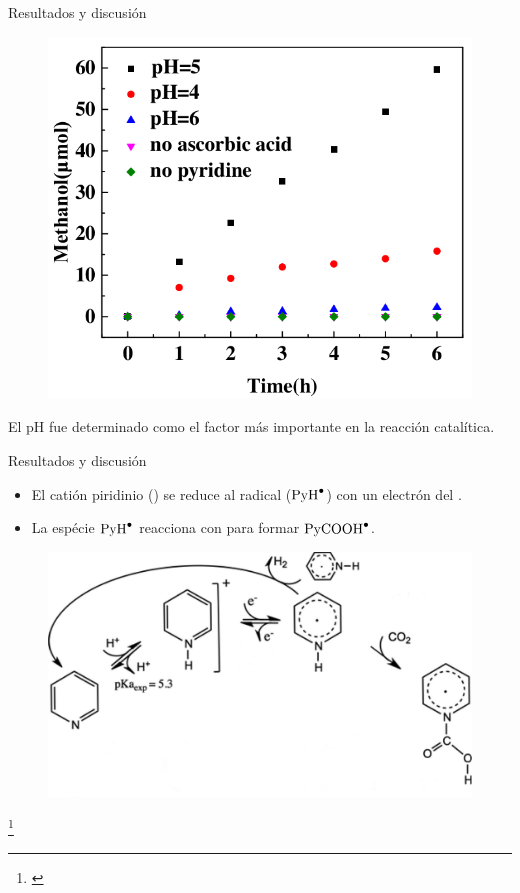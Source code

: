 \documentclass[handout]{beamer}
\newcommand\blfootnote[1]
{%
	\begingroup
	\renewcommand\thefootnote{}\footnote{#1}%
	\addtocounter{footnote}{-1}%
	\endgroup
}
\newcommand{\fcite}[1]{\blfootnote{\cite{#1}}}
\begin{document}
\begin{frame}{Resultados y discusi\'on}
	\begin{figure}[h]
		\centering
		\includegraphics[width=0.5\linewidth]{sources/pHt}
	\end{figure}
	El pH fue determinado como el factor m\'as importante en la reacci\'on catal\'itica.
\end{frame}

\begin{frame}{Resultados y discusi\'on}
	\begin{itemize}
		\item El cati\'on piridinio () se reduce al radical ($\ce{PyH^{\bullet}}$) con un electr\'on del .
		\item La esp\'ecie $\ce{PyH^{\bullet}}$ reacciona con  para formar $\ce{PyCOOH^{\bullet}}$.
	\end{itemize}
	\begin{figure}[h]
		\centering
		\includegraphics[width=0.6\linewidth]{sources/mechanism}
	\end{figure}
	\fcite{lim2012mechanism}
\end{frame}
\end{document}
